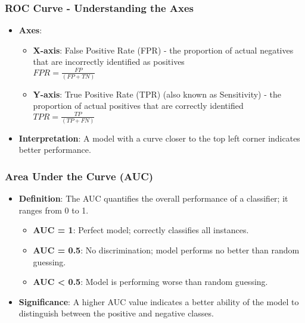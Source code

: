 \documentclass[aspectratio=169]{beamer}
\begin{document}
\begin{frame}[fragile]
    \frametitle{ROC Curve - Understanding the Axes}
    \begin{itemize}
        \item \textbf{Axes}:
        \begin{itemize}
            \item \textbf{X-axis}: False Positive Rate (FPR) - the proportion of actual negatives that are incorrectly identified as positives \\
            $FPR = \frac{FP}{(FP + TN)}$
            \item \textbf{Y-axis}: True Positive Rate (TPR) (also known as Sensitivity) - the proportion of actual positives that are correctly identified \\
            $TPR = \frac{TP}{(TP + FN)}$
        \end{itemize}
        \item \textbf{Interpretation}: A model with a curve closer to the top left corner indicates better performance.
    \end{itemize}
\end{frame}

\begin{frame}[fragile]
    \frametitle{Area Under the Curve (AUC)}
    \begin{itemize}
        \item \textbf{Definition}: The AUC quantifies the overall performance of a classifier; it ranges from 0 to 1.
        \begin{itemize}
            \item \textbf{AUC = 1}: Perfect model; correctly classifies all instances.
            \item \textbf{AUC = 0.5}: No discrimination; model performs no better than random guessing.
            \item \textbf{AUC < 0.5}: Model is performing worse than random guessing.
        \end{itemize}
        \item \textbf{Significance}: A higher AUC value indicates a better ability of the model to distinguish between the positive and negative classes.
    \end{itemize}
\end{frame}
\end{document}
